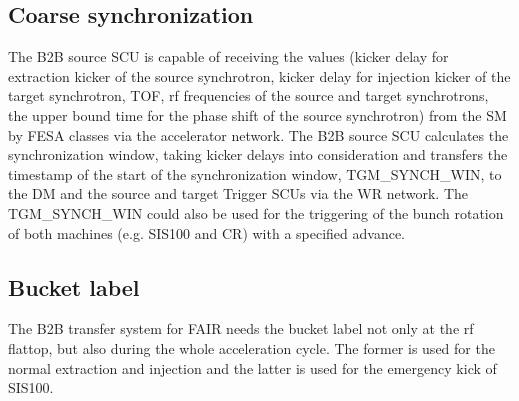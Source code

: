 \subsection{Coarse synchronization}

The B2B source SCU is capable of receiving the values (kicker delay for extraction kicker of the source synchrotron, kicker delay for injection kicker of the target synchrotron, TOF, rf frequencies of the source and target synchrotrons, the upper bound time for the phase shift of the source synchrotron) from the SM by FESA classes via the accelerator network. The B2B source SCU calculates the synchronization window, taking kicker delays into consideration and transfers the timestamp of the start of the synchronization window, TGM\_SYNCH\_WIN, to the DM and the source and target Trigger SCUs via the WR network. The TGM\_SYNCH\_WIN could also be used for the triggering of the bunch rotation of both machines (e.g. SIS100 and CR) with a specified advance. 

\subsection{Bucket label}
The B2B transfer system for FAIR needs the bucket label not only at the rf flattop, but also during the whole acceleration cycle. The former is used for the normal extraction and injection and the latter is used for the emergency kick of SIS100. 

